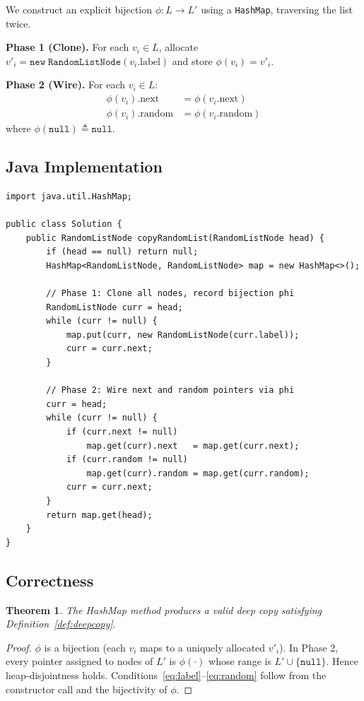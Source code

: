 \documentclass[10pt,journal,compsoc]{IEEEtran}
\newtheorem{theorem}{Theorem}
\begin{document}
We construct an explicit bijection $\phi: L \to L'$ using a \texttt{HashMap}, traversing the list twice.

\textbf{Phase 1 (Clone).} For each $v_i \in L$, allocate $v'_i = \mathtt{new}\;\mathtt{RandomListNode}(v_i.\mathrm{label})$ and store $\phi(v_i) = v'_i$.

\textbf{Phase 2 (Wire).} For each $v_i \in L$:
\begin{align}
  \phi(v_i).\mathrm{next}   &= \phi(v_i.\mathrm{next}) \\
  \phi(v_i).\mathrm{random} &= \phi(v_i.\mathrm{random})
\end{align}
where $\phi(\mathtt{null}) \triangleq \mathtt{null}$.

\subsection{Java Implementation}

\begin{verbatim}
import java.util.HashMap;

public class Solution {
    public RandomListNode copyRandomList(RandomListNode head) {
        if (head == null) return null;
        HashMap<RandomListNode, RandomListNode> map = new HashMap<>();

        // Phase 1: Clone all nodes, record bijection phi
        RandomListNode curr = head;
        while (curr != null) {
            map.put(curr, new RandomListNode(curr.label));
            curr = curr.next;
        }

        // Phase 2: Wire next and random pointers via phi
        curr = head;
        while (curr != null) {
            if (curr.next != null)
                map.get(curr).next   = map.get(curr.next);
            if (curr.random != null)
                map.get(curr).random = map.get(curr.random);
            curr = curr.next;
        }
        return map.get(head);
    }
}
\end{verbatim}

\subsection{Correctness}

\begin{theorem}
The HashMap method produces a valid deep copy satisfying Definition~\ref{def:deepcopy}.
\end{theorem}

\begin{proof}
$\phi$ is a bijection (each $v_i$ maps to a uniquely allocated $v'_i$). In Phase 2, every pointer assigned to nodes of $L'$ is $\phi(\cdot)$ whose range is $L' \cup \{\mathtt{null}\}$. Hence heap-disjointness holds. Conditions~\eqref{eq:label}--\eqref{eq:random} follow from the constructor call and the bijectivity of $\phi$.
\end{proof}
\end{document}
